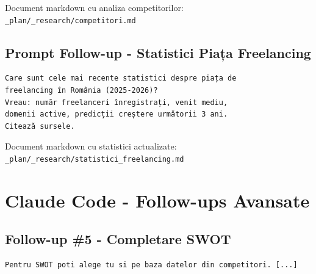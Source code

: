 \documentclass[11pt,a4paper]{article}
\begin{document}
\begin{tcolorbox}[colback=outputbackground,colframe=green!75!black,title=Output Generat]
Document markdown cu analiza competitorilor: \texttt{\_plan/\_research/competitori.md}
\end{tcolorbox}

\subsection{Prompt Follow-up - Statistici Piața Freelancing}

\begin{tcolorbox}[colback=promptbackground,colframe=blue!75!black,title=Prompt Input]
\begin{verbatim}
Care sunt cele mai recente statistici despre piața de
freelancing în România (2025-2026)?
Vreau: număr freelanceri înregistrați, venit mediu,
domenii active, predicții creștere următorii 3 ani.
Citează sursele.
\end{verbatim}
\end{tcolorbox}

\begin{tcolorbox}[colback=outputbackground,colframe=green!75!black,title=Output Generat]
Document markdown cu statistici actualizate: \texttt{\_plan/\_research/statistici\_freelancing.md}
\end{tcolorbox}

\newpage
\section{Claude Code - Follow-ups Avansate}

\subsection{Follow-up \#5 - Completare SWOT}

\begin{tcolorbox}[colback=promptbackground,colframe=blue!75!black,title=Prompt Input]
\begin{verbatim}
Pentru SWOT poti alege tu si pe baza datelor din competitori. [...]
\end{verbatim}
\end{tcolorbox}
\end{document}
